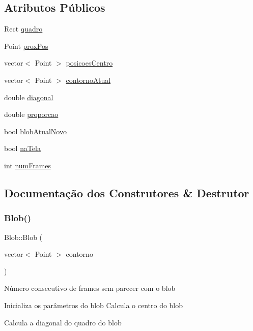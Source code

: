 \subsection*{Atributos Públicos}
\begin{DoxyCompactItemize}
\item 
Rect \hyperlink{class_blob_aa6387723adb0b9bc5972cf68cc85f4b3}{quadro}
\item 
Point \hyperlink{class_blob_ad4eeb7d2aa4ef4f6c6e038737ce41043}{prox\+Pos}
\item 
vector$<$ Point $>$ \hyperlink{class_blob_a07f56ca5b367f2a9b15622d92e2c671a}{posicoes\+Centro}
\item 
vector$<$ Point $>$ \hyperlink{class_blob_a83d705f2b426be288d87c6f606175889}{contorno\+Atual}
\item 
double \hyperlink{class_blob_ad77546934e684be45fa6d12d8370d0c7}{diagonal}
\item 
double \hyperlink{class_blob_a0e1f64cf95a07d948728f9e00d1feec1}{proporcao}
\item 
bool \hyperlink{class_blob_a121b1af88b7c0752403f6eca92ab2150}{blob\+Atual\+Novo}
\item 
bool \hyperlink{class_blob_a57b76134e44f731fdb2afcf85de066c4}{na\+Tela}
\item 
int \hyperlink{class_blob_a3c6b8107db4ef7269ad117f1120a69e3}{num\+Frames}
\end{DoxyCompactItemize}


\subsection{Documentação dos Construtores \& Destrutor}
\mbox{\label{class_blob_af61bf71a4f486a4eeba6165bbfdbb8f6}} 
\subsubsection{\texorpdfstring{Blob()}{Blob()}}
{\footnotesize\ttfamily Blob\+::\+Blob (\begin{DoxyParamCaption}\item[{vector$<$ Point $>$}]{contorno }\end{DoxyParamCaption})}

Número consecutivo de frames sem parecer com o blob

Inicializa os parâmetros do blob Calcula o centro do blob

Calcula a diagonal do quadro do blob

